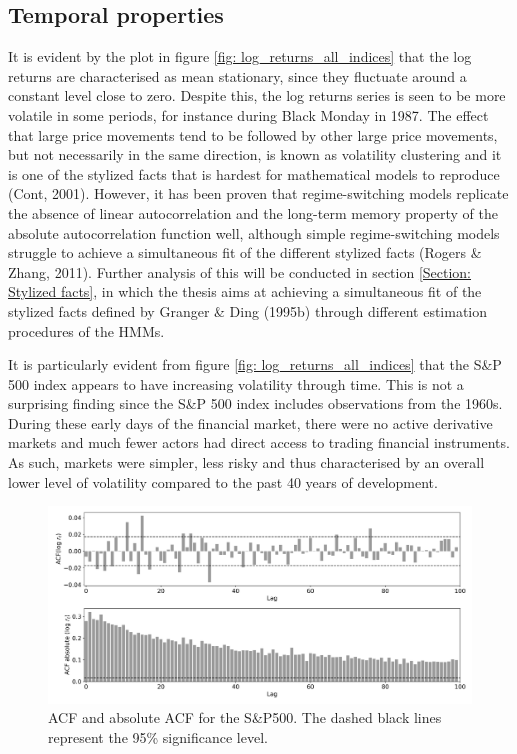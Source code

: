 \subsection{Temporal properties}
\label{subsection: temporal properties}
It is evident by the plot in figure \ref{fig: log_returns_all_indices} that the log returns are characterised as mean stationary, since they fluctuate around a constant level close to zero. Despite this, the log returns series is seen to be more volatile in some periods, for instance during Black Monday in 1987. The effect that large price movements tend to be followed by other large price movements, but not necessarily in the same direction, is known as volatility clustering and it is one of the stylized facts that is hardest for mathematical models to reproduce (Cont, 2001). However, it has been proven that regime-switching models replicate the absence of linear autocorrelation and the long-term memory property of the absolute autocorrelation function well, although simple regime-switching models struggle to achieve a simultaneous fit of the
different stylized facts (Rogers \& Zhang, 2011). Further analysis of this will be conducted in section \ref{Section: Stylized facts}, in which the thesis aims at achieving a simultaneous fit of the stylized facts defined by Granger \& Ding (1995b) through different estimation procedures of the HMMs.

It is particularly evident from figure \ref{fig: log_returns_all_indices} that the S\&P 500 index appears to have increasing volatility through time. This is not a surprising finding since the S\&P 500 index includes observations from the 1960s. During these early days of the financial market, there were no active derivative markets and much fewer actors had direct access to trading financial instruments. As such, markets were simpler, less risky and thus characterised by an overall lower level of volatility compared to the past 40 years of development.

\begin{figure}[H] 
    \centering
    \includegraphics[width=1\textwidth]{analysis/data_description/images/SP500_ACF.png}
    \caption[ACF and absolute ACF for the S\&P500]{ACF and absolute ACF for the S\&P500. The dashed black lines represent the 95\% significance level.}
    \label{fig: ACF_all_log_returns}
\end{figure}

